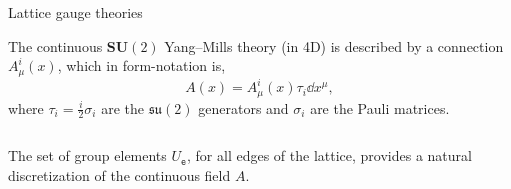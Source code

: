 \documentclass{beamer}
\begin{document}
\begin{frame}{Lattice gauge theories}
    \begin{list}{\maltese}{\leftmargin=1em \itemindent=0em}
        \item<1-> The continuous $\mathbf{SU}(2)$ Yang–Mills theory (in 4D) is described by a connection $A^i_\mu(x)$, which in form-notation is,
        \begin{equation}
            A(x)=A^i_\mu(x)\tau_i\dd{x^\mu},
        \end{equation}
        where $\tau_i=\frac{i}{2}\sigma_i$ are the $\mathfrak{su}(2)$ generators and $\sigma_i$ are the Pauli matrices.
        \item<2-> \noindent
        \begin{minipage}{\linewidth}
            \begin{columns}
            \end{columns}
        \end{minipage}
        \item<5-> The set of group elements $U_\mathtt{e}$, for all edges of the lattice, provides a natural discretization of the continuous field $A$.
    \end{list}
\end{frame}
\end{document}
